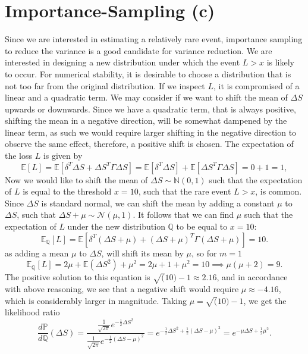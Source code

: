 \documentclass{article}
\begin{document}


\section{Importance-Sampling (c)}
Since we are interested in estimating a relatively rare event, importance sampling to reduce the variance is a good candidate for variance reduction. We are interested in designing a new distribution under which the event $L > x$ is likely to occur. For numerical stability, it is desirable to choose a distribution that is not too far from the original distribution. If we inspect $L$, it is compromised of a linear and a quadratic term. We may consider if we want to shift the mean of $\Delta S$ upwards or downwards. Since we have a quadratic term, that is always positive, shifting the mean in a negative direction, will be somewhat dampened by the linear term, as such we would require larger shifting in the negative direction to observe the same effect, therefore, a positive shift is chosen. \vspace{.5cm}
The expectation of the loss $L$ is given by
\begin{equation*}
    \mathbb{E}[L] = \mathbb{E}[\delta^T\Delta S + \Delta S^T\Gamma\Delta S] = \mathbb{E}[\delta^T\Delta S] + \mathbb{E}[\Delta S^T\Gamma\Delta S] = 0 + 1 = 1,
\end{equation*}
Now we would like to shift the mean of $\Delta S \sim \mathbb{N}(0, 1)$ such that the expectation of $L$ is equal to the threshold $x = 10$, such that the rare event $L > x$, is common.
Since $\Delta S$ is standard normal, we can shift the mean by adding a constant $\mu$ to $\Delta S$, such that $\Delta S + \mu \sim \mathcal{N}(\mu, 1)$.
It follows that we can find $\mu$ such that the expectation of $L$ under the new distribution $\mathbb{Q}$ to be equal to $x = 10$:
\begin{equation*}
    \mathbb{E}_{\mathbb{Q}}[L] = \mathbb{E}[\delta^T(\Delta S + \mu) + (\Delta S + \mu)^T\Gamma(\Delta S + \mu)] = 10.
\end{equation*}
as adding a mean $\mu$ to $\Delta S$, will shift its mean by $\mu$, so for $m = 1$
\begin{equation*}
    \mathbb{E}_{\mathbb{Q}}[L] = 2\mu + \mathbb{E}(\Delta S^2) + \mu^2 = 2\mu + 1 + \mu^2 = 10 \implies \mu(\mu + 2) = 9.
\end{equation*}
The positive solution to this equation is $\sqrt(10) -1 \approx 2.16$, and in accordance with above reasoning, we see that a negative shift would require $\mu \approx -4.16$, which is considerably larger in magnitude. Taking $\mu = \sqrt(10) -1$, we get the likelihood ratio
\begin{equation*}
    \dfrac{d\mathbb{P}}{d\mathbb{Q}}(\Delta S) = \dfrac{\frac{1}{\sqrt{2\pi}}e^{-\frac{1}{2}\Delta S^2}}{\frac{1}{\sqrt{2\pi}}e^{-\frac{1}{2}(\Delta S - \mu)^2}} = e^{-\frac{1}{2}\Delta S^2 + \frac{1}{2}(\Delta S - \mu)^2} = e^{-\mu\Delta S + \frac{1}{2}\mu^2}.
\end{equation*}
\end{document}
